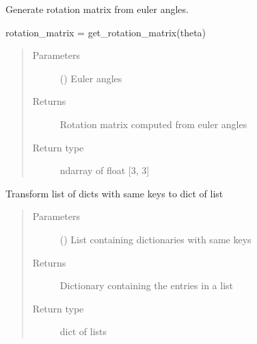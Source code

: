 \documentclass[letterpaper,10pt,english,openany,oneside]{sphinxmanual}
\begin{document}

\begin{fulllineitems}
\label{\detokenize{pygpc:pygpc.misc.get_rotation_matrix}}
Generate rotation matrix from euler angles.

rotation\_matrix = get\_rotation\_matrix(theta)
\begin{quote}\begin{description}
\item[{Parameters}] \leavevmode
{} (\sphinxstyleliteralemphasis{\sphinxupquote{ {[}}}\sphinxstyleliteralemphasis{\sphinxupquote{{]}}}) \textendash{} Euler angles

\item[{Returns}] \leavevmode
{} \textendash{} Rotation matrix computed from euler angles

\item[{Return type}] \leavevmode
ndarray of float {[}3, 3{]}

\end{description}\end{quote}

\end{fulllineitems}


\begin{fulllineitems}
\label{\detokenize{pygpc:pygpc.misc.list2dict}}
Transform list of dicts with same keys to dict of list
\begin{quote}\begin{description}
\item[{Parameters}] \leavevmode
{} () \textendash{} List containing dictionaries with same keys

\item[{Returns}] \leavevmode
{} \textendash{} Dictionary containing the entries in a list

\item[{Return type}] \leavevmode
dict of lists

\end{description}\end{quote}

\end{fulllineitems}
\end{document}
